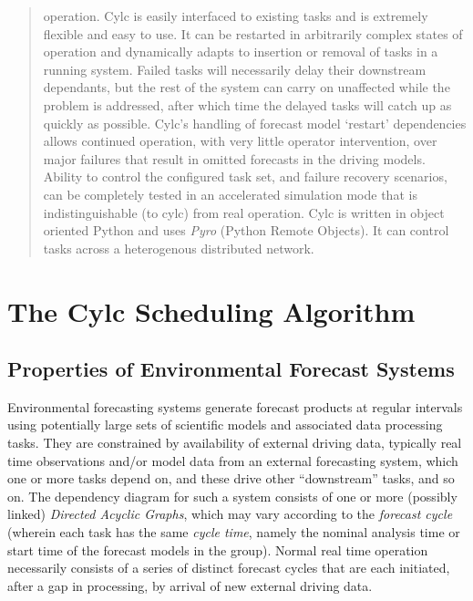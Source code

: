 \documentclass[11pt,a4paper]{article}
\begin{document}
\begin{abstract}
    operation. Cylc is easily interfaced to existing tasks and is
    extremely flexible and easy to use. It can be restarted in
    arbitrarily complex states of operation and dynamically adapts to
    insertion or removal of tasks in a running system.  Failed tasks
    will necessarily delay their downstream dependants, but the rest of
    the system can carry on unaffected while the problem is addressed,
    after which time the delayed tasks will catch up as quickly as
    possible.  Cylc's handling of forecast model `restart' dependencies
    allows continued operation, with very little operator intervention,
    over major failures that result in omitted forecasts in the driving
    models.  Ability to control the configured task set, and failure
    recovery scenarios, can be completely tested in an accelerated
    simulation mode that is indistinguishable (to cylc) from real
    operation.  Cylc is written in object oriented Python and uses {\em
    Pyro} (Python Remote Objects). It can control tasks across a
    heterogenous distributed network.  

\end{abstract}

\pagebreak
\section{The Cylc Scheduling Algorithm}
\label{sec:FS}

\subsection{Properties of Environmental Forecast Systems}

Environmental forecasting systems generate forecast products at regular
intervals using potentially large sets of scientific models and
associated data processing tasks. They are constrained by availability
of external driving data, typically real time observations and/or model
data from an external forecasting system, which one or more tasks depend
on, and these drive other ``downstream'' tasks, and so on. The
dependency diagram for such a system consists of one or more (possibly
linked) {\em Directed Acyclic Graphs}, which may vary according to the
{\em forecast cycle} (wherein each task has the same {\em cycle time},
namely the nominal analysis time or start time of the forecast models in
the group). Normal real time operation necessarily consists of a series
of distinct forecast cycles that are each initiated, after a gap in
processing, by arrival of new external driving data.
\end{document}
